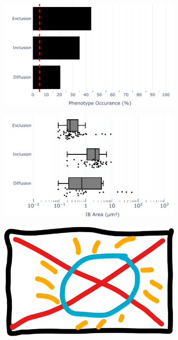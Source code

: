 \begin{figure}
    \begin{subfigure}{0.5\textwidth}
        \caption{}
        \includegraphics[width=1\linewidth]{10. Chapter 5/Figs/03. IFIT2-FLAG/03. IFIT2F/01. pIB/01. bar_hi2f_hnhp.pdf} 
    \end{subfigure}
    \begin{subfigure}{0.5\textwidth}
        \caption{}
        \includegraphics[width=1\linewidth]{10. Chapter 5/Figs/03. IFIT2-FLAG/03. IFIT2F/01. pIB/02. box_hi2f_hnhp.pdf}
    \end{subfigure}
    \begin{subfigure}{1\textwidth}
        \centering
        \caption{}
        \includegraphics[width=1\linewidth]{10. Chapter 5/Figs/00. placeholder.png}

\end{subfigure}
\end{figure}
